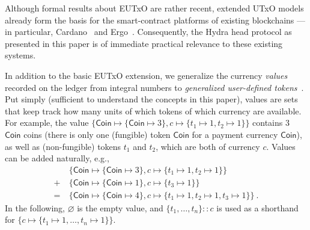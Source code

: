 Although formal results about EUTxO are rather recent, extended UTxO models already form the basis for the smart-contract platforms of existing blockchains --- in particular, Cardano~\cite{plutus-platform} and Ergo~\cite{ergo-platform}. Consequently, the Hydra head protocol as presented in this paper is of immediate practical relevance to these existing systems.

%
In addition to the basic EUTxO extension, we generalize the
currency \emph{values} recorded on the ledger from integral numbers to \emph{generalized
  user-defined tokens}~\cite{eutxo-2}.
Put simply (sufficient to understand the concepts in this paper),
values are sets that keep track how many units of which tokens of
which currency are available.  For example, the value
$\{\mathsf{Coin} \mapsto \{\mathsf{Coin} \mapsto 3\}, c \mapsto \{t_1
\mapsto 1, t_2 \mapsto 1\}\}$ contains $3$ $\mathsf{Coin}$ coins
(there is only one (fungible) token $\mathsf{Coin}$ for a payment
currency $\mathsf{Coin}$), as well as (non-fungible) tokens $t_1$ and $t_2$, which
are both of currency $c$.  Values can be added naturally, e.g.,
\begin{align*}
  & \{\mathsf{Coin} \mapsto \{\mathsf{Coin} \mapsto 3\}, c \mapsto \{t_1
    \mapsto 1, t_2 \mapsto 1\}\} \\
  + \ & \{\mathsf{Coin} \mapsto \{\mathsf{Coin} \mapsto 1\}, c \mapsto \{t_3 \mapsto 1\}\} \\
  = \ & \{\mathsf{Coin} \mapsto \{\mathsf{Coin} \mapsto 4\}, c \mapsto \{t_1
        \mapsto 1, t_2 \mapsto 1, t_3 \mapsto 1\}\} \ .
\end{align*}
%
In the following, $\varnothing$ is the empty value, and
\(\{t_1, \ldots, t_n\} :: c\) is used as a shorthand for
\(\{c \mapsto \{t_1 \mapsto 1, \ldots, t_n \mapsto 1\}\}\).




